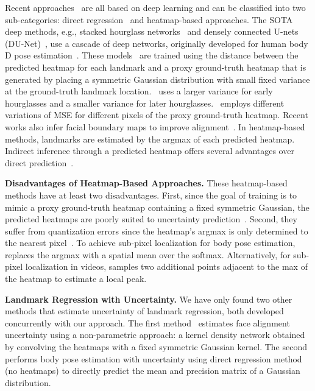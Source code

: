 \documentclass[10pt,twocolumn,letterpaper]{article}
\newcommand{\example}{{e.g.}}
\newcommand{\1}{{\bf 1}}
\newcommand{\0}{{\bf 0}}
\begin{document}
    Recent approaches~\cite{Zhang2014eccvCFAN, toshev2014deeppose, zhu2015face, yang2017stacked, bulat2017far, wu2018look, tang2019towards, wang2019adaptive} are all based on deep learning and can be classified into two sub-categories: direct regression~\cite{toshev2014deeppose, carreira2016human} and heatmap-based approaches. The SOTA deep methods, \example, stacked hourglass networks~\cite{yang2017stacked, bulat2017far} and densely connected U-nets (DU-Net)~\cite{tang2019towards}, use a cascade of deep networks, originally developed for human body D pose estimation~\cite{newell2016stacked}. These models~\cite{newell2016stacked, bulat2017far, tang2018quantized, tang2019towards} are trained using the  distance between the predicted heatmap for each landmark and a proxy ground-truth heatmap that is generated by placing a symmetric Gaussian distribution with small fixed variance at the ground-truth landmark location.~\cite{li2019rethinking} uses a larger variance for early hourglasses and a smaller variance for later hourglasses.~\cite{wang2019adaptive} employs different variations of MSE for different pixels of the proxy ground-truth heatmap. Recent works also infer facial boundary maps to improve alignment~\cite{wu2018look,wang2019adaptive}. In heatmap-based methods,  landmarks are estimated by the argmax of each predicted heatmap. Indirect inference through a predicted heatmap offers several advantages over direct prediction~\cite{Belagiannis17}.
    
    \textbf{Disadvantages of Heatmap-Based Approaches.} These heatmap-based methods have at least two disadvantages. First, since the goal of training is to mimic a proxy ground-truth heatmap containing a fixed symmetric Gaussian, the predicted heatmaps are poorly suited to uncertainty prediction~\cite{kdnuncertain, chen2019face}. Second, they suffer from quantization errors since the heatmap's argmax is only determined to the nearest pixel~\cite{luvizon20182d,nibali2018numerical,tai2019towards}. To achieve sub-pixel localization for body pose estimation,~\cite{luvizon20182d} replaces the argmax with a spatial mean over the softmax. Alternatively, for sub-pixel localization in videos, \cite{tai2019towards} samples two additional points adjacent to the max of the heatmap to estimate a local peak.  
    
    \textbf{Landmark Regression with Uncertainty.}
    We have only found two other methods that estimate uncertainty of landmark regression, both developed concurrently with our approach. The first method~\cite{kdnuncertain, chen2019face} estimates face alignment uncertainty using a non-parametric approach: a kernel density network obtained by convolving the heatmaps with a fixed symmetric Gaussian kernel. The second~\cite{gundavarapu2019structured} performs body pose estimation with uncertainty using direct regression method (no heatmaps) to directly predict the mean and precision matrix of a Gaussian distribution.
\end{document}
